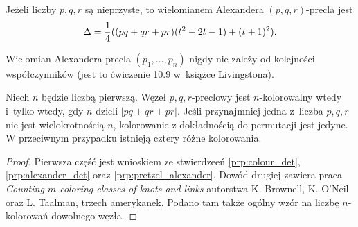 \begin{proposition}
    \label{prp:pretzel_alexander}
    Jeżeli liczby $p, q, r$ są nieprzyste, to wielomianem Alexandera $(p, q, r)$-precla jest
    \begin{equation}
        \Delta = \frac 14 ((pq+qr+pr) (t^2-2t-1) + (t+1)^2).
    \end{equation}
\end{proposition}

Wielomian Alexandera precla $(p_1, \ldots, p_n)$ nigdy nie zależy od kolejności współczynników (jest to ćwiczenie 10.9 w~książce Livingstona).

\begin{proposition}
    Niech $n$ będzie liczbą pierwszą.
    Węzeł $p, q, r$-preclowy jest $n$-kolorowalny wtedy i~tylko wtedy, gdy $n$ dzieli $|pq+qr+pr|$.
    Jeśli przynajmniej jedna z~liczba $p, q, r$ nie jest wielokrotnością $n$, kolorowanie z dokładnością do permutacji jest jedyne.
    W przeciwnym przypadku istnieją cztery różne kolorowania.
\end{proposition}

\begin{proof}
    Pierwsza część jest wnioskiem ze stwierdzeeń \ref{prp:colour_det}, \ref{prp:alexander_det} oraz \ref{prp:pretzel_alexander}.
    Dowód drugiej zawiera praca \emph{Counting $m$-coloring classes of knots and links} autorstwa K. Brownell, K. O'Neil oraz L. Taalman, trzech amerykanek.
    Podano tam także ogólny wzór na liczbę $n$-kolorowań dowolnego węzła.
\end{proof}

